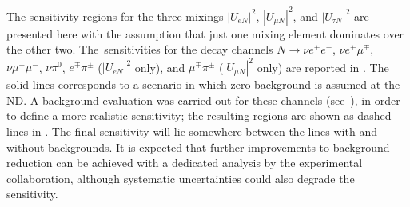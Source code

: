 The sensitivity regions for the three mixings $|U_{e N}|^2$, $|U_{\mu N}|^2$, and %
$|U_{\tau N}|^2$ are presented here with the assumption that just one mixing element dominates over the other two.
The~sensitivities for the decay channels $N\to\nu e^+ e^-$, $\nu e^\pm \mu^\mp$, $\nu \mu^+ \mu^-$, $\nu \pi^0$, %
$e^\mp \pi^\pm$ ($|U_{e N}|^2$ only), and $\mu^\mp \pi^\pm$ ($|U_{\mu N}|^2$ only) are reported in .
The solid lines corresponds to a scenario in which zero background is assumed at the ND.
A background evaluation was carried out for these channels (see~), %
in order to define a more realistic sensitivity; %
the resulting regions are shown as dashed lines in .
The final sensitivity will lie somewhere between the lines with and without backgrounds.
It is expected that further improvements to background reduction can be achieved %
with a dedicated analysis by the experimental collaboration, %
although systematic uncertainties could also degrade the sensitivity.


